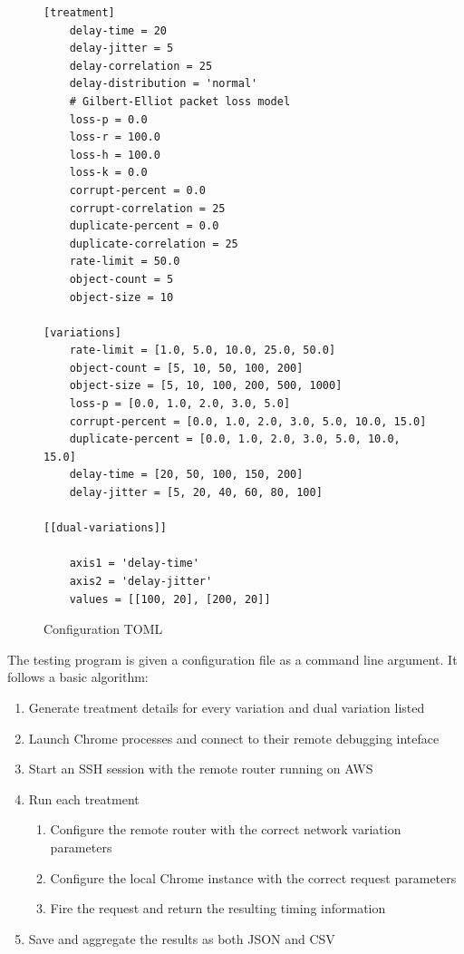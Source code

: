\documentclass[12pt]{article}
\begin{document}
\begin{figure}
\begin{lstlisting}
[treatment]
	delay-time = 20
	delay-jitter = 5
	delay-correlation = 25
	delay-distribution = 'normal'
	# Gilbert-Elliot packet loss model
	loss-p = 0.0
	loss-r = 100.0
	loss-h = 100.0
	loss-k = 0.0
	corrupt-percent = 0.0
	corrupt-correlation = 25
	duplicate-percent = 0.0
	duplicate-correlation = 25
	rate-limit = 50.0
	object-count = 5
	object-size = 10

[variations]
	rate-limit = [1.0, 5.0, 10.0, 25.0, 50.0]
	object-count = [5, 10, 50, 100, 200]
	object-size = [5, 10, 100, 200, 500, 1000]
	loss-p = [0.0, 1.0, 2.0, 3.0, 5.0]
	corrupt-percent = [0.0, 1.0, 2.0, 3.0, 5.0, 10.0, 15.0]
	duplicate-percent = [0.0, 1.0, 2.0, 3.0, 5.0, 10.0, 15.0]
	delay-time = [20, 50, 100, 150, 200]
	delay-jitter = [5, 20, 40, 60, 80, 100]

[[dual-variations]]

	axis1 = 'delay-time'
	axis2 = 'delay-jitter'
	values = [[100, 20], [200, 20]]
\end{lstlisting}
\label{fig:config}
\caption{Configuration TOML}
\end{figure}

The testing program is given a configuration file as a command line argument. It follows a basic algorithm:

\begin{enumerate}[topsep=0pt,itemsep=-1ex,partopsep=1ex,parsep=1ex]
	\item Generate treatment details for every variation and dual variation listed
	\item Launch Chrome processes and connect to their remote debugging inteface
	\item Start an SSH session with the remote router running on AWS
	\item Run each treatment
	\begin{enumerate}[topsep=0pt,itemsep=-1ex,partopsep=1ex,parsep=1ex]
		\item Configure the remote router with the correct network variation parameters
		\item Configure the local Chrome instance with the correct request parameters
		\item Fire the request and return the resulting timing information
	\end{enumerate}
	\item Save and aggregate the results as both JSON and CSV
\end{enumerate}
\end{document}
